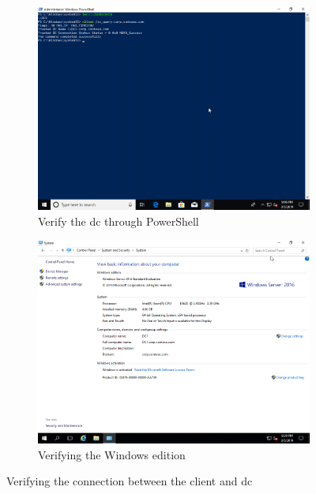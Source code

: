 \begin{figure}[h]\ContinuedFloat
	\begin{subfigure}{0.5\textwidth}
		\captionsetup{width=0.8\linewidth}
		\includegraphics[width=0.9\linewidth]{img/Methodologie/Prerequisites3.png}
		\centering
		\caption{Verify the \acrshort{dc} through PowerShell}
	\end{subfigure}
	\begin{subfigure}{0.5\textwidth}
		\captionsetup{width=0.8\linewidth}
		\includegraphics[width=0.9\linewidth]{img/Methodologie/Prerequisites4.png} 
		\centering	
		\caption{Verifying the Windows edition}
	\end{subfigure}
	\caption[Side-by-side migration prerequisites]{Verifying the connection between the client and \acrshort{dc}}
	\label{fig:PrerequisitesMigration}
\end{figure}

